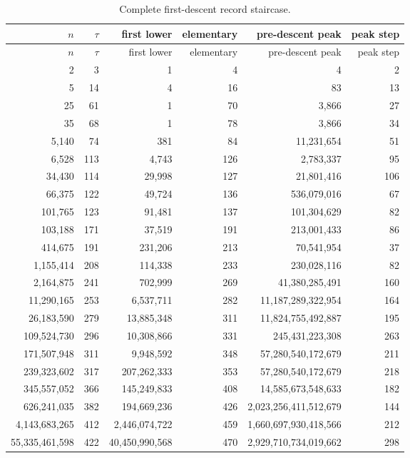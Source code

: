 \documentclass[11pt]{article}
\theoremstyle{definition}
\begin{document}
\begin{longtable}{r r r r r r}
\caption{Complete first-descent record staircase.}\\
\toprule
$n$ & $\tau$ & first lower & elementary & pre-descent peak & peak step\\
\midrule
\endfirsthead
\toprule
$n$ & $\tau$ & first lower & elementary & pre-descent peak & peak step\\
\midrule
\endhead
2 & 3 & 1 & 4 & 4 & 2 \\
5 & 14 & 4 & 16 & 83 & 13 \\
25 & 61 & 1 & 70 & 3{,}866 & 27 \\
35 & 68 & 1 & 78 & 3{,}866 & 34 \\
5{,}140 & 74 & 381 & 84 & 11{,}231{,}654 & 51 \\
6{,}528 & 113 & 4{,}743 & 126 & 2{,}783{,}337 & 95 \\
34{,}430 & 114 & 29{,}998 & 127 & 21{,}801{,}416 & 106 \\
66{,}375 & 122 & 49{,}724 & 136 & 536{,}079{,}016 & 67 \\
101{,}765 & 123 & 91{,}481 & 137 & 101{,}304{,}629 & 82 \\
103{,}188 & 171 & 37{,}519 & 191 & 213{,}001{,}433 & 86 \\
414{,}675 & 191 & 231{,}206 & 213 & 70{,}541{,}954 & 37 \\
1{,}155{,}414 & 208 & 114{,}338 & 233 & 230{,}028{,}116 & 82 \\
2{,}164{,}875 & 241 & 702{,}999 & 269 & 41{,}380{,}285{,}491 & 160 \\
11{,}290{,}165 & 253 & 6{,}537{,}711 & 282 & 11{,}187{,}289{,}322{,}954 & 164 \\
26{,}183{,}590 & 279 & 13{,}885{,}348 & 311 & 11{,}824{,}755{,}492{,}887 & 195 \\
109{,}524{,}730 & 296 & 10{,}308{,}866 & 331 & 245{,}431{,}223{,}308 & 263 \\
171{,}507{,}948 & 311 & 9{,}948{,}592 & 348 & 57{,}280{,}540{,}172{,}679 & 211 \\
239{,}323{,}602 & 317 & 207{,}262{,}333 & 353 & 57{,}280{,}540{,}172{,}679 & 218 \\
345{,}557{,}052 & 366 & 145{,}249{,}833 & 408 & 14{,}585{,}673{,}548{,}633 & 182 \\
626{,}241{,}035 & 382 & 194{,}669{,}236 & 426 & 2{,}023{,}256{,}411{,}512{,}679 & 144 \\
4{,}143{,}683{,}265 & 412 & 2{,}446{,}074{,}722 & 459 & 1{,}660{,}697{,}930{,}418{,}566 & 212 \\
55{,}335{,}461{,}598 & 422 & 40{,}450{,}990{,}568 & 470 & 2{,}929{,}710{,}734{,}019{,}662 & 298 \\
\bottomrule
\end{longtable}
\end{document}
